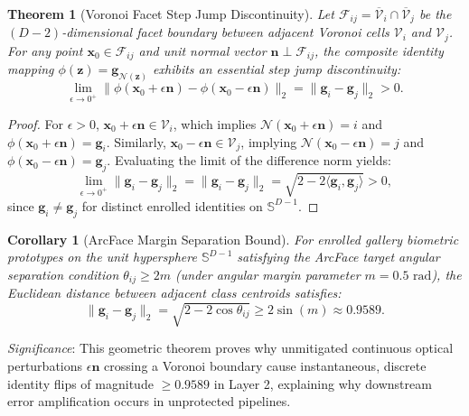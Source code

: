 \documentclass[conference]{IEEEtran}
\newtheorem{theorem}{Theorem}
\newtheorem{corollary}{Corollary}
\begin{document}
\begin{theorem}[Voronoi Facet Step Jump Discontinuity]
Let $\mathcal{F}_{ij} = \overline{\mathcal{V}}_i \cap \overline{\mathcal{V}}_j$ be the $(D-2)$-dimensional facet boundary between adjacent Voronoi cells $\mathcal{V}_i$ and $\mathcal{V}_j$. For any point $\mathbf{x}_0 \in \mathcal{F}_{ij}$ and unit normal vector $\mathbf{n} \perp \mathcal{F}_{ij}$, the composite identity mapping $\phi(\mathbf{z}) = \mathbf{g}_{\mathcal{N}(\mathbf{z})}$ exhibits an essential step jump discontinuity:
\begin{equation}
\lim_{\epsilon \to 0^+} \|\phi(\mathbf{x}_0 + \epsilon \mathbf{n}) - \phi(\mathbf{x}_0 - \epsilon \mathbf{n})\|_2 = \|\mathbf{g}_i - \mathbf{g}_j\|_2 > 0.
\end{equation}
\end{theorem}

\begin{proof}
For $\epsilon > 0$, $\mathbf{x}_0 + \epsilon \mathbf{n} \in \mathcal{V}_i$, which implies $\mathcal{N}(\mathbf{x}_0 + \epsilon \mathbf{n}) = i$ and $\phi(\mathbf{x}_0 + \epsilon \mathbf{n}) = \mathbf{g}_i$. Similarly, $\mathbf{x}_0 - \epsilon \mathbf{n} \in \mathcal{V}_j$, implying $\mathcal{N}(\mathbf{x}_0 - \epsilon \mathbf{n}) = j$ and $\phi(\mathbf{x}_0 - \epsilon \mathbf{n}) = \mathbf{g}_j$. Evaluating the limit of the difference norm yields:
\begin{equation}
\lim_{\epsilon \to 0^+} \|\mathbf{g}_i - \mathbf{g}_j\|_2 = \|\mathbf{g}_i - \mathbf{g}_j\|_2 = \sqrt{2 - 2\langle \mathbf{g}_i, \mathbf{g}_j \rangle} > 0,
\end{equation}
since $\mathbf{g}_i \neq \mathbf{g}_j$ for distinct enrolled identities on $\mathbb{S}^{D-1}$.
\end{proof}

\begin{corollary}[ArcFace Margin Separation Bound]
For enrolled gallery biometric prototypes on the unit hypersphere $\mathbb{S}^{D-1}$ satisfying the ArcFace target angular separation condition $\theta_{ij} \ge 2m$ (under angular margin parameter $m = 0.5\text{ rad}$), the Euclidean distance between adjacent class centroids satisfies:
\begin{equation}
\|\mathbf{g}_i - \mathbf{g}_j\|_2 = \sqrt{2 - 2\cos \theta_{ij}} \ge 2\sin(m) \approx 0.9589.
\end{equation}
\end{corollary}
\textit{Significance}: This geometric theorem proves why unmitigated continuous optical perturbations $\epsilon \mathbf{n}$ crossing a Voronoi boundary cause instantaneous, discrete identity flips of magnitude $\ge 0.9589$ in Layer 2, explaining why downstream error amplification occurs in unprotected pipelines.
\end{document}
